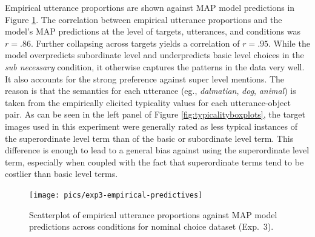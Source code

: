 \documentclass[11pt]{article}
\newcommand{\figref}[1]{Figure \ref{#1}}
\begin{document}
Empirical utterance proportions are shown against MAP model  predictions in \figref{fig:nompredictives}. 
The correlation between empirical utterance proportions and the model's MAP predictions at the level of targets, utterances, and conditions was $r = .86$. Further collapsing across targets yields a correlation of $r = .95$.
While the model overpredicts subordinate	 level  and underpredicts basic level choices in the \emph{sub necessary} condition, it otherwise captures the patterns in the data very well. It also accounts for the strong preference against super level mentions. The reason is that the semantics for each utterance (eg., \emph{dalmatian}, \emph{dog}, \emph{animal}) is taken from the empirically elicited typicality values for each utterance-object pair. As can be seen in the left panel of \figref{fig:typicalityboxplots},  the target images used in this experiment were generally rated as less typical instances of the superordinate level term than of the basic or subordinate level term. This difference is enough to lead to a general bias against using the superordinate level term, especially when coupled with the fact that superordinate terms tend to be costlier than basic level terms.


\begin{figure}
\centering
\texttt{[image: pics/exp3-empirical-predictives]}
\caption{Scatterplot of empirical utterance proportions against MAP model predictions across conditions for nominal choice dataset (Exp.~3).}
\label{fig:nompredictives}
\end{figure}




\end{document}
